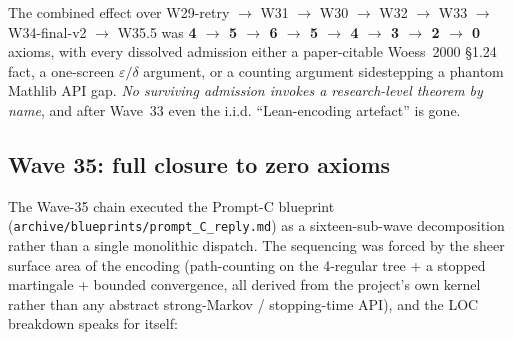 \documentclass[11pt,a4paper]{article}
\theoremstyle{plain}
\theoremstyle{definition}
\begin{document}
The combined effect over W29-retry $\to$ W31 $\to$ W30 $\to$ W32
$\to$ W33 $\to$ W34-final-v2 $\to$ W35.5 was
\textbf{4 $\to$ 5 $\to$ 6 $\to$ 5 $\to$ 4 $\to$ 3 $\to$ 2 $\to$
\textbf{0}} axioms, with every dissolved admission either a
paper-citable Woess~2000 \S1.24 fact, a one-screen
$\varepsilon/\delta$ argument, or a counting argument
sidestepping a phantom Mathlib API gap. \emph{No surviving
admission invokes a research-level theorem by name}, and after
Wave~33 even the i.i.d. ``Lean-encoding artefact'' is gone.

\subsection{Wave 35: full closure to zero axioms}\label{sec:w35closure}

The Wave-35 chain executed the Prompt-C blueprint
(\texttt{archive/blueprints/prompt\_C\_reply.md}) as a sixteen-sub-wave
decomposition rather than a single monolithic dispatch. The sequencing
was forced by the sheer surface area of the encoding (path-counting
on the 4-regular tree + a stopped martingale + bounded convergence,
all derived from the project's own kernel rather than any abstract
strong-Markov / stopping-time API), and the LOC breakdown speaks for
itself:
\end{document}
